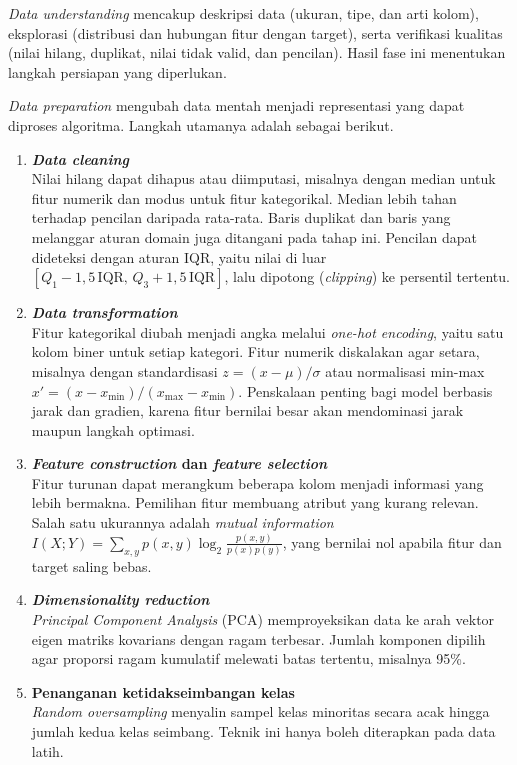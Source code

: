 \textit{Data understanding} mencakup deskripsi data (ukuran, tipe, dan arti kolom), eksplorasi (distribusi dan hubungan fitur dengan target), serta verifikasi kualitas (nilai hilang, duplikat, nilai tidak valid, dan pencilan). Hasil fase ini menentukan langkah persiapan yang diperlukan.

\textit{Data preparation} mengubah data mentah menjadi representasi yang dapat diproses algoritma. Langkah utamanya adalah sebagai berikut.
\begin{enumerate}
    \setlength{\itemsep}{0pt}
    \item \textbf{\textit{Data cleaning}}\\
    Nilai hilang dapat dihapus atau diimputasi, misalnya dengan median untuk fitur numerik dan modus untuk fitur kategorikal. Median lebih tahan terhadap pencilan daripada rata-rata. Baris duplikat dan baris yang melanggar aturan domain juga ditangani pada tahap ini. Pencilan dapat dideteksi dengan aturan IQR, yaitu nilai di luar $[Q_1-1{,}5\,\mathrm{IQR},\,Q_3+1{,}5\,\mathrm{IQR}]$, lalu dipotong (\textit{clipping}) ke persentil tertentu.
    \item \textbf{\textit{Data transformation}}\\
    Fitur kategorikal diubah menjadi angka melalui \textit{one-hot encoding}, yaitu satu kolom biner untuk setiap kategori. Fitur numerik diskalakan agar setara, misalnya dengan standardisasi $z=(x-\mu)/\sigma$ atau normalisasi min-max $x'=(x-x_{\min})/(x_{\max}-x_{\min})$. Penskalaan penting bagi model berbasis jarak dan gradien, karena fitur bernilai besar akan mendominasi jarak maupun langkah optimasi.
    \item \textbf{\textit{Feature construction} dan \textit{feature selection}}\\
    Fitur turunan dapat merangkum beberapa kolom menjadi informasi yang lebih bermakna. Pemilihan fitur membuang atribut yang kurang relevan. Salah satu ukurannya adalah \textit{mutual information} $I(X;Y)=\sum_{x,y}p(x,y)\log_2\frac{p(x,y)}{p(x)p(y)}$, yang bernilai nol apabila fitur dan target saling bebas.
    \item \textbf{\textit{Dimensionality reduction}}\\
    \textit{Principal Component Analysis} (PCA) memproyeksikan data ke arah vektor eigen matriks kovarians dengan ragam terbesar. Jumlah komponen dipilih agar proporsi ragam kumulatif melewati batas tertentu, misalnya 95\%.
    \item \textbf{Penanganan ketidakseimbangan kelas}\\
    \textit{Random oversampling} menyalin sampel kelas minoritas secara acak hingga jumlah kedua kelas seimbang. Teknik ini hanya boleh diterapkan pada data latih.
\end{enumerate}

